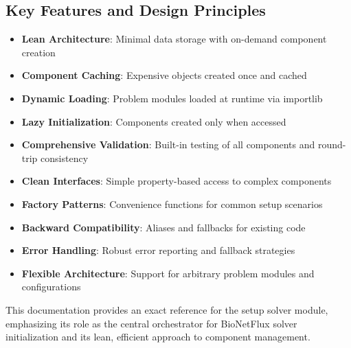 \subsection{Key Features and Design Principles}

\begin{itemize}
    \item \textbf{Lean Architecture}: Minimal data storage with on-demand component creation
    \item \textbf{Component Caching}: Expensive objects created once and cached
    \item \textbf{Dynamic Loading}: Problem modules loaded at runtime via importlib
    \item \textbf{Lazy Initialization}: Components created only when accessed
    \item \textbf{Comprehensive Validation}: Built-in testing of all components and round-trip consistency
    \item \textbf{Clean Interfaces}: Simple property-based access to complex components
    \item \textbf{Factory Patterns}: Convenience functions for common setup scenarios
    \item \textbf{Backward Compatibility}: Aliases and fallbacks for existing code
    \item \textbf{Error Handling}: Robust error reporting and fallback strategies
    \item \textbf{Flexible Architecture}: Support for arbitrary problem modules and configurations
\end{itemize}

This documentation provides an exact reference for the setup solver module, emphasizing its role as the central orchestrator for BioNetFlux solver initialization and its lean, efficient approach to component management.

